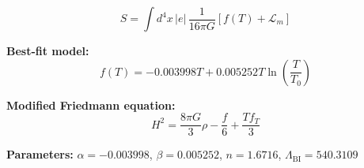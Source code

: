 
\begin{equation}
  S = \int d^4x \, |e| \, \frac{1}{16\pi G} \left[ f(T) + \mathcal{L}_m \right]
\end{equation}

\textbf{Best-fit model:}
\begin{equation}
  f(T) = -0.003998 T + 0.005252 T \ln\!\left(\frac{T}{T_0}\right)
\end{equation}

\textbf{Modified Friedmann equation:}
\begin{equation}
  H^2 = \frac{8\pi G}{3} \rho - \frac{f}{6} + \frac{T f_T}{3}
\end{equation}

\textbf{Parameters:}
$\alpha = -0.003998$, \quad
$\beta = 0.005252$, \quad
$n = 1.6716$, \quad
$\Lambda_{\text{BI}} = 540.3109$